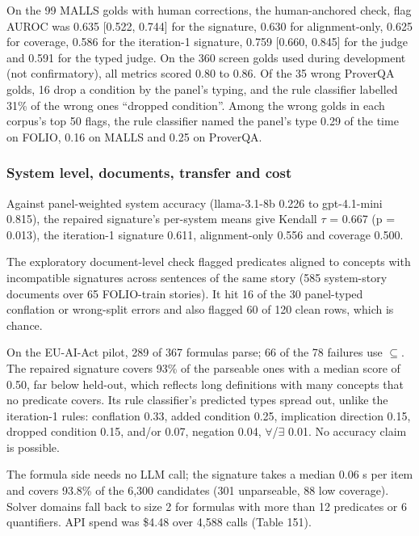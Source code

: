 \documentclass[11pt,letterpaper]{article}
\begin{document}
On the 99 MALLS golds with human corrections, the human-anchored check, flag AUROC was 0.635 [0.522, 0.744] for the signature, 0.630 for alignment-only, 0.625 for coverage, 0.586 for the iteration-1 signature, 0.759 [0.660, 0.845] for the judge and 0.591 for the typed judge. On the 360 screen golds used during development (not confirmatory), all metrics scored 0.80 to 0.86. Of the 35 wrong ProverQA golds, 16 drop a condition by the panel's typing, and the rule classifier labelled 31\% of the wrong ones ``dropped condition''. Among the wrong golds in each corpus's top 50 flags, the rule classifier named the panel's type 0.29 of the time on FOLIO, 0.16 on MALLS and 0.25 on ProverQA.

\subsubsection{System level, documents, transfer and cost}

Against panel-weighted system accuracy (llama-3.1-8b 0.226 to gpt-4.1-mini 0.815), the repaired signature's per-system means give Kendall $\tau$ = 0.667 (p = 0.013), the iteration-1 signature 0.611, alignment-only 0.556 and coverage 0.500.

The exploratory document-level check flagged predicates aligned to concepts with incompatible signatures across sentences of the same story (585 system-story documents over 65 FOLIO-train stories). It hit 16 of the 30 panel-typed conflation or wrong-split errors and also flagged 60 of 120 clean rows, which is chance.

On the EU-AI-Act pilot, 289 of 367 formulas parse; 66 of the 78 failures use \texttt{$\subseteq$}. The repaired signature covers 93\% of the parseable ones with a median score of 0.50, far below held-out, which reflects long definitions with many concepts that no predicate covers. Its rule classifier's predicted types spread out, unlike the iteration-1 rules: conflation 0.33, added condition 0.25, implication direction 0.15, dropped condition 0.15, and/or 0.07, negation 0.04, $\forall$/$\exists$ 0.01. No accuracy claim is possible.

The formula side needs no LLM call; the signature takes a median 0.06 s per item and covers 93.8\% of the 6,300 candidates (301 unparseable, 88 low coverage). Solver domains fall back to size 2 for formulas with more than 12 predicates or 6 quantifiers. API spend was \$4.48 over 4,588 calls (Table 151).
\end{document}

